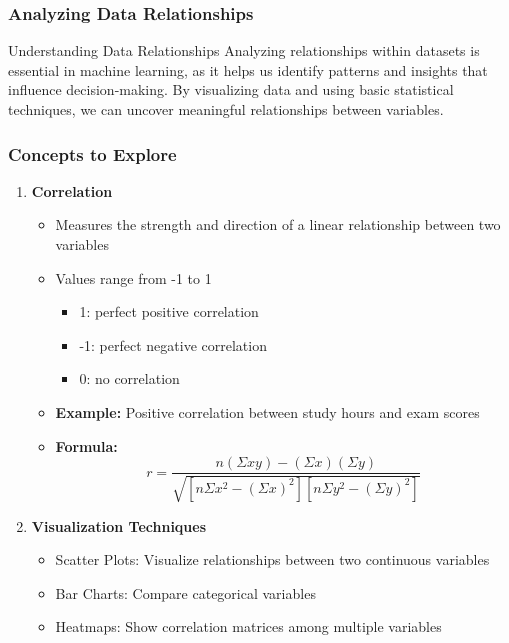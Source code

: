 \documentclass[aspectratio=169]{beamer}
\begin{document}
\begin{frame}[fragile]
    \frametitle{Analyzing Data Relationships}
    \begin{block}{Understanding Data Relationships}
        Analyzing relationships within datasets is essential in machine learning, as it helps us identify patterns and insights that influence decision-making. By visualizing data and using basic statistical techniques, we can uncover meaningful relationships between variables.
    \end{block}
\end{frame}

\begin{frame}[fragile]
    \frametitle{Concepts to Explore}
    \begin{enumerate}
        \item \textbf{Correlation}
            \begin{itemize}
                \item Measures the strength and direction of a linear relationship between two variables
                \item Values range from -1 to 1
                \begin{itemize}
                    \item 1: perfect positive correlation
                    \item -1: perfect negative correlation
                    \item 0: no correlation
                \end{itemize}
                \item \textbf{Example:} Positive correlation between study hours and exam scores
                \item \textbf{Formula:}
                \begin{equation}
                r = \frac{n(\Sigma xy) - (\Sigma x)(\Sigma y)}{\sqrt{[n\Sigma x^2 - (\Sigma x)^2][n\Sigma y^2 - (\Sigma y)^2]}}
                \end{equation}
            \end{itemize}
        
        \item \textbf{Visualization Techniques}
        \begin{itemize}
            \item Scatter Plots: Visualize relationships between two continuous variables
            \item Bar Charts: Compare categorical variables
            \item Heatmaps: Show correlation matrices among multiple variables
        \end{itemize}
    \end{enumerate}
\end{frame}
\end{document}
